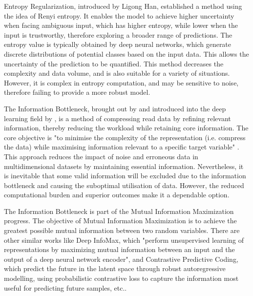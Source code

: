 \documentclass{article}
\begin{document}
Entropy Regularization\cite{han2019unsuperviseddomainadaptationcalibrating}, introduced by Ligong Han, established a method using the idea of Renyi entropy. It enables the model to achieve higher uncertainty when facing ambiguous input, which has higher entropy, while lower when the input is trustworthy, therefore exploring a broader range of predictions. The entropy value is typically obtained by deep neural networks, which generate discrete distributions of potential classes based on the input data. This allows the uncertainty of the prediction to be quantified. This method decreases the complexity and data volume, and is also suitable for a variety of situations. However, it is complex in entropy computation, and may be sensitive to noise, therefore failing to provide a more robust model.

The Information Bottleneck, brought out by \cite{tishby2000informationbottleneckmethod} and introduced into the deep learning field by \cite{shwartzziv2017openingblackboxdeep},  is a method of compressing read data by refining relevant information, thereby reducing the workload while retaining core information. The core objective is "to minimise the complexity of the representation (i.e. compress the data) while maximising information relevant to a specific target variable" \cite{shwartzziv2023compresscompressselfsupervisedlearning}. This approach reduces the impact of noise and erroneous data in multidimensional datasets by maintaining essential information.  Nevertheless, it is inevitable that some valid information will be excluded due to the information bottleneck and causing the suboptimal utilisation of data. However, the reduced computational burden and superior outcomes make it a dependable option.

The Information Bottleneck is part of the Mutual Information Maximization progress. The objective of Mutual Information Maximization is to achieve the greatest possible mutual information between two random variables. There are other similar works like Deep InfoMax\cite{hjelm2019learningdeeprepresentationsmutual},  which "perform unsupervised learning of representations by maximizing mutual information between an input and the output of a deep neural network encoder", and Contrastive Predictive Coding\cite{oord2019representationlearningcontrastivepredictive}, which predict the future in the latent space through robust autoregressive modelling, using probabilistic contrastive loss to capture the information most useful for predicting future samples, etc..
\end{document}
